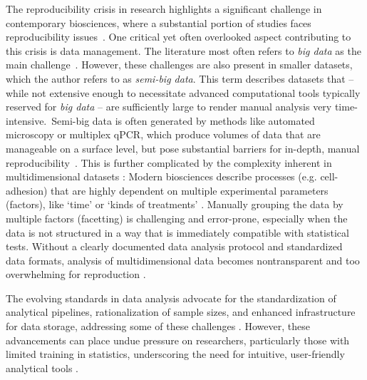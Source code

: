 %
\label{sec:C2_introduction}%
The reproducibility crisis in research highlights a significant challenge in
contemporary biosciences, where a substantial portion of studies faces
reproducibility issues~\cite{baker500ScientistsLift2016,
      begleyReproducibilityScienceImproving2015,
      gosselinInsufficientTransparencyStatistical2021}. One critical yet often
overlooked aspect contributing to this crisis is data management. The literature
most often refers to \textit{big data} as the main
challenge~\cite{gomez-cabreroDataIntegrationEra2014}. However, these challenges
are also present in smaller datasets, which the author refers to as
\textit{semi-big data}. This term describes datasets that -- while not extensive
enough to necessitate advanced computational tools typically reserved for
\textit{big data} -- are sufficiently large to render manual analysis very
time-intensive.~Semi-big data is often generated by methods like automated
microscopy or multiplex qPCR, which produce volumes of data that are manageable
on a surface level, but pose substantial barriers for in-depth, manual
reproducibility~\cite{bustinReproducibilityBiomedicalResearch2014,
      incertiYouStillUsing2019a}. This is further complicated by the complexity
inherent in multidimensional datasets \cite{krzywinskiMultidimensionalData2013}:
Modern biosciences describe processes (e.g. cell-adhesion) that are highly
dependent on multiple experimental parameters (factors), like `time' or `kinds
of treatments' \cite{reblTimedependentMetabolicActivity2010,
      mckayCellcellAdhesionMolecules1997}. Manually grouping the data by multiple
factors (facetting) is challenging and error-prone, especially when the data is
not structured in a way that is immediately compatible with statistical tests.
Without a clearly documented data analysis protocol and standardized data
formats, analysis of multidimensional data becomes nontransparent and too
overwhelming for reproduction
\cite{bustinReproducibilityBiomedicalResearch2014}.



The evolving standards in data analysis advocate for the standardization of
analytical pipelines, rationalization of sample sizes, and enhanced
infrastructure for data storage, addressing some of these challenges
\cite{goodmanWhatDoesResearch2016, wilkinsonFAIRGuidingPrinciples2016}. However,
these advancements can place undue pressure on researchers, particularly those
with limited training in statistics, underscoring the need for intuitive,
user-friendly analytical tools \cite{federerDataLiteracyTraining2016,
      lakhlifiIllusionKnowledgeStatistics2023, armstrongWhenUseBonferroni2014,
      gomez-lopezPrecisionMedicineNeeds2019, leekStatisticsValuesAre2015}.

